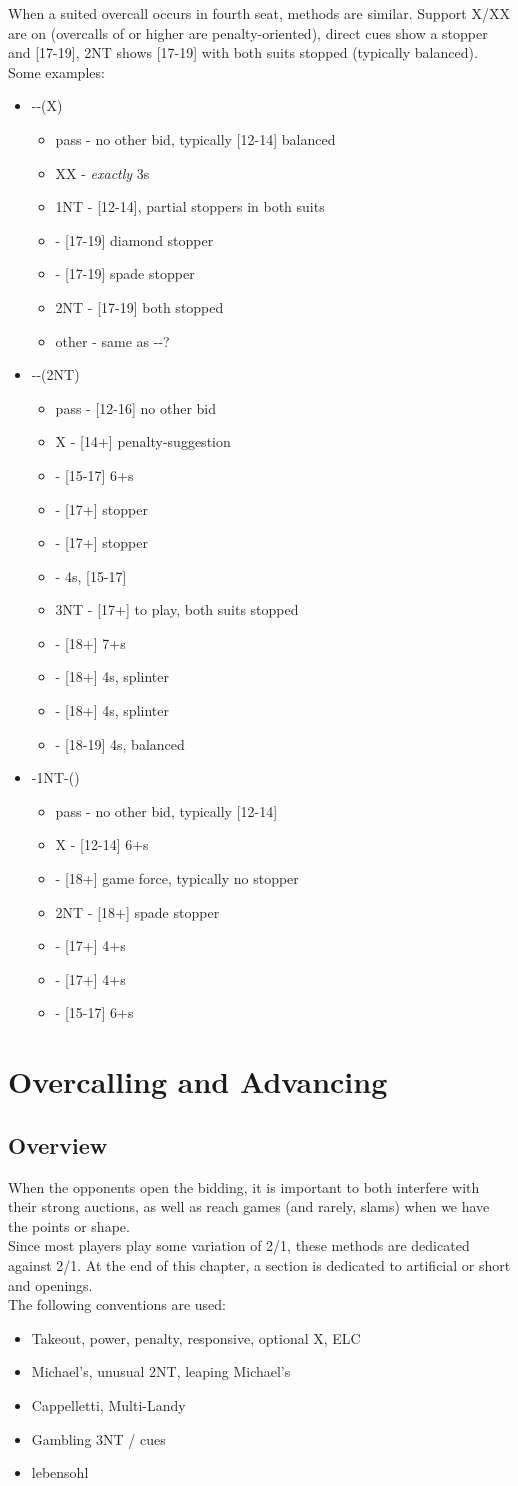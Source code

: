 \documentclass[12pt]{report}
\newcommand{\n}{\\}
\newcommand{\ul}[1]{\begin{itemize}#1\end{itemize}}
\newcommand{\li}{\item[~]}
\begin{document}
    When a suited overcall occurs in fourth seat, methods are similar.  Support X/XX are on (overcalls of  or higher are penalty-oriented), direct cues show a stopper and [17-19], 2NT shows [17-19] with both suits stopped (typically balanced).  Some examples:

    \ul {
        \li {}--(X)
        \ul {
            \li pass - no other bid, typically [12-14] balanced
            \li XX - \textit{exactly} 3\he{}s
            \li 1NT - [12-14], partial stoppers in both suits
            \li \di2 - [17-19] diamond stopper
            \li \sp2 - [17-19] spade stopper
            \li 2NT - [17-19] both stopped
            \li other - same as \cl1-\he1-?
        }
        \li \cl1-\sp1-(2NT)
        \ul {
            \li pass - [12-16] no other bid
            \li X - [14+] penalty-suggestion
            \li \cl3 - [15-17] 6+\cl{}s
            \li \di3 - [17+] stopper
            \li \he3 - [17+] stopper
            \li \sp3 - 4\sp{}s, [15-17]
            \li 3NT - [17+] to play, both suits stopped
            \li \cl4 - [18+] 7+\cl{}s
            \li \di4 - [18+] 4\sp{}s, splinter
            \li \di4 - [18+] 4\he{}s, splinter
            \li \sp4 - [18-19] 4\sp{}s, balanced
        }
        \li \he1-1NT-(\he2)
        \ul {
            \li pass - no other bid, typically [12-14]
            \li X - [12-14] 6+\he{}s
            \li \sp2 - [18+] game force, typically no stopper
            \li 2NT - [18+] spade stopper
            \li \cl3 - [17+] 4+\cl{}s
            \li \di3 - [17+] 4+\di{}s
            \li \he3 - [15-17] 6+\he{}s
        }
    }
\chapter{Overcalling and Advancing}
\section{Overview} \label{4:1}
    
    When the opponents open the bidding, it is important to both interfere with their strong auctions, as well as reach games (and rarely, slams) when we have the points or shape.\n

    Since most players play some variation of 2/1, these methods are dedicated against 2/1.  At the end of this chapter, a section is dedicated to artificial or short  and  openings. \n

    The following conventions are used:
    \begin{itemize} \itemsep0em
        \item Takeout, power, penalty, responsive, optional X, ELC
        \item Michael's, unusual 2NT, leaping Michael's
        \item Cappelletti, Multi-Landy
        \item Gambling 3NT / cues
        \item lebensohl\n
    \end{itemize}
\end{document}
